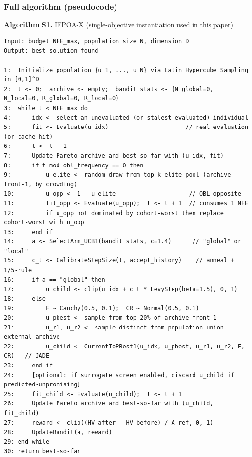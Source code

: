 \documentclass[
  9pt,
]{extarticle}
\begin{document}
\subsubsection{Full algorithm
(pseudocode)}\label{full-algorithm-pseudocode}

\textbf{Algorithm S1.} IFPOA-X (single-objective instantiation used in
this paper)

\begin{verbatim}
Input: budget NFE_max, population size N, dimension D
Output: best solution found

1:  Initialize population {u_1, ..., u_N} via Latin Hypercube Sampling in [0,1]^D
2:  t <- 0;  archive <- empty;  bandit stats <- {N_global=0, N_local=0, R_global=0, R_local=0}
3:  while t < NFE_max do
4:      idx <- select an unevaluated (or stalest-evaluated) individual
5:      fit <- Evaluate(u_idx)                      // real evaluation (or cache hit)
6:      t <- t + 1
7:      Update Pareto archive and best-so-far with (u_idx, fit)
8:      if t mod obl_frequency == 0 then
9:          u_elite <- random draw from top-k elite pool (archive front-1, by crowding)
10:         u_opp <- 1 - u_elite                     // OBL opposite
11:         fit_opp <- Evaluate(u_opp);  t <- t + 1  // consumes 1 NFE
12:         if u_opp not dominated by cohort-worst then replace cohort-worst with u_opp
13:     end if
14:     a <- SelectArm_UCB1(bandit stats, c=1.4)      // "global" or "local"
15:     c_t <- CalibrateStepSize(t, accept_history)    // anneal + 1/5-rule
16:     if a == "global" then
17:         u_child <- clip(u_idx + c_t * LevyStep(beta=1.5), 0, 1)
18:     else
19:         F ~ Cauchy(0.5, 0.1);  CR ~ Normal(0.5, 0.1)
20:         u_pbest <- sample from top-20% of archive front-1
21:         u_r1, u_r2 <- sample distinct from population union external archive
22:         u_child <- CurrentToPBest1(u_idx, u_pbest, u_r1, u_r2, F, CR)   // JADE
23:     end if
24:     [optional: if surrogate screen enabled, discard u_child if predicted-unpromising]
25:     fit_child <- Evaluate(u_child);  t <- t + 1
26:     Update Pareto archive and best-so-far with (u_child, fit_child)
27:     reward <- clip((HV_after - HV_before) / A_ref, 0, 1)
28:     UpdateBandit(a, reward)
29: end while
30: return best-so-far
\end{verbatim}
\end{document}
